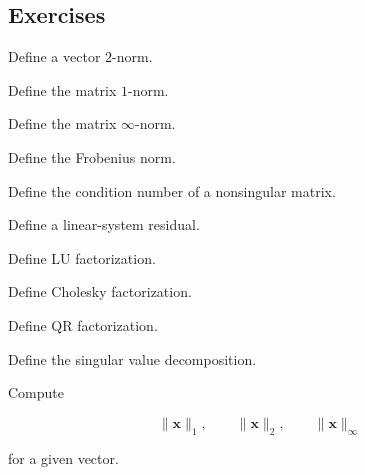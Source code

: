 \subsection{Exercises}
\label{subsec:nla-exercises}

\begin{exercise}[1]
Define a vector \(2\)-norm.
\end{exercise}

\begin{exercise}[1]
Define the matrix \(1\)-norm.
\end{exercise}

\begin{exercise}[1]
Define the matrix \(\infty\)-norm.
\end{exercise}

\begin{exercise}[1]
Define the Frobenius norm.
\end{exercise}

\begin{exercise}[1]
Define the condition number of a nonsingular matrix.
\end{exercise}

\begin{exercise}[1]
Define a linear-system residual.
\end{exercise}

\begin{exercise}[1]
Define LU factorization.
\end{exercise}

\begin{exercise}[1]
Define Cholesky factorization.
\end{exercise}

\begin{exercise}[1]
Define QR factorization.
\end{exercise}

\begin{exercise}[1]
Define the singular value decomposition.
\end{exercise}

\begin{exercise}[2]
Compute

\[
\|\mathbf{x}\|_1,
\qquad
\|\mathbf{x}\|_2,
\qquad
\|\mathbf{x}\|_\infty
\]

for a given vector.
\end{exercise}

